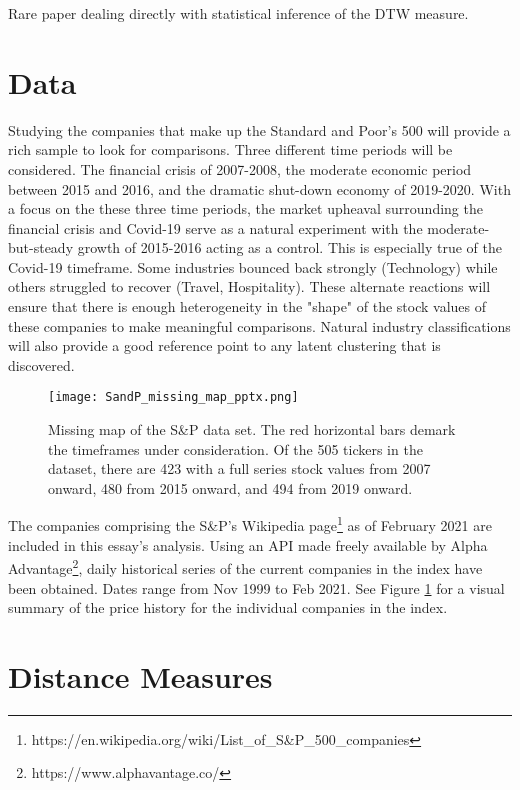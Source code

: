 \documentclass[12pt]{article}
\begin{document}
\parencite{DuyTakeuchi2023statistical} Rare paper dealing directly with statistical inference of the DTW measure.
\section{Data}

Studying the companies that make up the Standard and Poor's 500 will provide a rich sample to look for comparisons. Three different time periods will be considered. The financial crisis of 2007-2008, the moderate economic period between 2015 and 2016, and the dramatic shut-down economy of 2019-2020. With a focus on the these three time periods, the market upheaval surrounding the financial crisis and Covid-19 serve as a natural experiment with the moderate-but-steady growth of 2015-2016 acting as a control. This is especially true of the Covid-19 timeframe. Some industries bounced back strongly (Technology) while others struggled to recover (Travel, Hospitality). These alternate reactions will ensure that there is enough heterogeneity in the "shape" of the stock values of these companies to make meaningful comparisons. Natural industry classifications will also provide a good reference point to any latent clustering that is discovered.

\begin{figure}
    \centering
    \texttt{[image: SandP\_missing\_map\_pptx.png]}
    \caption{Missing map of the S\&P data set. The red horizontal bars demark the timeframes under consideration. Of the 505 tickers in the dataset, there are 423 with a full series stock values from 2007 onward, 480 from 2015 onward, and 494 from 2019 onward.}
    \label{fig:SandP_missing_map}
\end{figure}


The companies comprising the S\&P's Wikipedia page\footnote{https://en.wikipedia.org/wiki/List\_of\_S\&P\_500\_companies} as of February 2021 are included in this essay's analysis. Using an API made freely available by Alpha Advantage\footnote{https://www.alphavantage.co/}, daily historical series of the current companies in the index have been obtained. Dates range from Nov 1999 to Feb 2021. See Figure \ref{fig:SandP_missing_map} for a visual summary of the price history for the individual companies in the index.

\section{Distance Measures}
\end{document}
